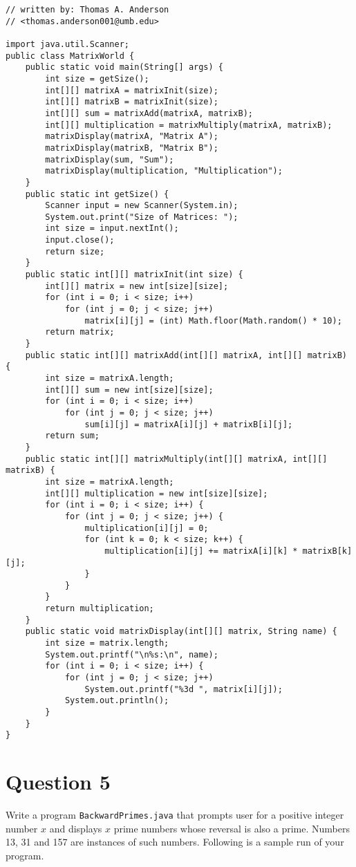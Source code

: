 \lstset{language=Java,tabsize=4}
\begin{lstlisting}
// written by: Thomas A. Anderson
// <thomas.anderson001@umb.edu>

import java.util.Scanner;
public class MatrixWorld {
	public static void main(String[] args) {
		int size = getSize();
		int[][] matrixA = matrixInit(size);
		int[][] matrixB = matrixInit(size);
		int[][] sum = matrixAdd(matrixA, matrixB);
		int[][] multiplication = matrixMultiply(matrixA, matrixB);
		matrixDisplay(matrixA, "Matrix A");
		matrixDisplay(matrixB, "Matrix B");
		matrixDisplay(sum, "Sum");
		matrixDisplay(multiplication, "Multiplication");
	}
	public static int getSize() {
		Scanner input = new Scanner(System.in);
		System.out.print("Size of Matrices: ");
		int size = input.nextInt();
		input.close();
		return size;
	}
	public static int[][] matrixInit(int size) {
		int[][] matrix = new int[size][size];
		for (int i = 0; i < size; i++)
			for (int j = 0; j < size; j++)
				matrix[i][j] = (int) Math.floor(Math.random() * 10);
		return matrix;
	}
	public static int[][] matrixAdd(int[][] matrixA, int[][] matrixB) {
		int size = matrixA.length;
		int[][] sum = new int[size][size];
		for (int i = 0; i < size; i++)
			for (int j = 0; j < size; j++)
				sum[i][j] = matrixA[i][j] + matrixB[i][j];
		return sum;
	}
	public static int[][] matrixMultiply(int[][] matrixA, int[][] matrixB) {
		int size = matrixA.length;
		int[][] multiplication = new int[size][size];
		for (int i = 0; i < size; i++) {
			for (int j = 0; j < size; j++) {
				multiplication[i][j] = 0;
				for (int k = 0; k < size; k++) {
					multiplication[i][j] += matrixA[i][k] * matrixB[k][j];
				}
			}
		}
		return multiplication;
	}
	public static void matrixDisplay(int[][] matrix, String name) {
		int size = matrix.length;
		System.out.printf("\n%s:\n", name);
		for (int i = 0; i < size; i++) {
			for (int j = 0; j < size; j++)
				System.out.printf("%3d ", matrix[i][j]);
			System.out.println();
		}
	}
}
\end{lstlisting}

\newpage

\section*{Question 5}
Write a program \texttt{BackwardPrimes.java} that prompts user for a positive integer number $x$ and displays $x$ prime numbers whose reversal is also a prime.
Numbers 13, 31 and 157 are instances of such numbers.
Following is a sample run of your program.

